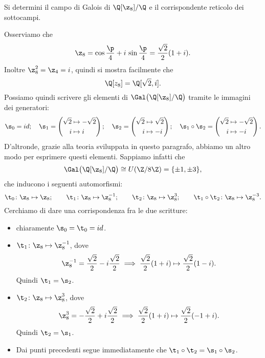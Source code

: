 \begin{exeN}
	Si determini il campo di Galois di \(\Q[\z_8]/\Q\) e il corrispondente reticolo dei sottocampi.
\end{exeN}

\begin{sol}
	Osserviamo che
	\[
		\z_8 = \cos \frac{\p}{4} + i\,\sin \frac{\p}{4} = \frac{\sqrt{2}}{2} (1+i).
	\]
	Inoltre \(\z_8^2 = \z_4 = i\), quindi si mostra facilmente che
	\[
		\Q[z_8] = \Q[\sqrt{2},i].
	\]
	Possiamo quindi scrivere gli elementi di \(\Gal\big(\Q[\z_8]/\Q\big)\) tramite le immagini dei generatori:
	\[
		\s_0 = id; \quad \s_1=
		\left(\begin{aligned}
				\sqrt{2} & \mapsto -\sqrt{2} \\
				i        & \mapsto i
			\end{aligned}\right);\quad
		\s_2=
		\left(\begin{aligned}
				\sqrt{2} & \mapsto \sqrt{2} \\
				i        & \mapsto -i
			\end{aligned}\right);\quad
		\s_1\circ \s_2=
		\left(\begin{aligned}
				\sqrt{2} & \mapsto -\sqrt{2} \\
				i        & \mapsto -i
			\end{aligned}\right).
	\]
	D'altronde, grazie alla teoria sviluppata in questo paragrafo, abbiamo un altro modo per esprimere questi elementi.
	Sappiamo infatti che
	\[
		\Gal\big(\Q[\z_8]/\Q\big) \cong U(\Z/8\Z) = \{\pm 1,\pm 3\},
	\]
	che inducono i seguenti automorfismi:
	\[
		\t_0\colon \z_8 \mapsto \z_8; \qquad \t_1\colon \z_8 \mapsto \z_8^{-1}; \qquad \t_2\colon \z_8 \mapsto \z_8^3; \qquad \t_1\circ \t_2\colon \z_8 \mapsto \z_8^{-3}.
	\]
	Cerchiamo di dare una corrispondenza fra le due scritture:
	\begin{itemize}
		\item chiaramente \(\s_0=\t_0=id\).
		\item \(\t_1\colon \z_8 \mapsto \z_8^{-1}\), dove
		      \[
			      \z_8^{-1} = \frac{\sqrt{2}}{2} - i \frac{\sqrt{2}}{2} \implies \frac{\sqrt{2}}{2}(1+i) \mapsto \frac{\sqrt{2}}{2}(1-i).
		      \]
		      Quindi \(\t_1=\s_2\).
		\item \(\t_2\colon \z_8 \mapsto \z_8^3\), dove
		      \[
			      \z_8^3 = -\frac{\sqrt{2}}{2}+i \frac{\sqrt{2}}{2} \implies \frac{\sqrt{2}}{2}(1+i) \mapsto \frac{\sqrt{2}}{2}(-1+i).
		      \]
		      Quindi \(\t_2=\s_1\).
		\item Dai punti precedenti segue immediatamente che \(\t_1\circ \t_2 =\s_1 \circ \s_2\).
	\end{itemize}
\end{sol}

